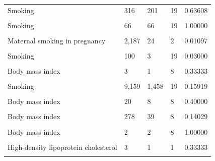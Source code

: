 \documentclass[11pt,oneside]{bristolthesis}
\begin{document}
\begin{table}
{\begin{tabular}[t]{lllll}
Smoking & 316 & 201 & 19 & 0.63608\\
\cellcolor{gray!6}{Arsenic exposure} & \cellcolor{gray!6}{200} & \cellcolor{gray!6}{1} & \cellcolor{gray!6}{1} & \cellcolor{gray!6}{0.00500}\\
\addlinespace
Smoking & 66 & 66 & 19 & 1.00000\\
\cellcolor{gray!6}{Smoking} & \cellcolor{gray!6}{748} & \cellcolor{gray!6}{544} & \cellcolor{gray!6}{19} & \cellcolor{gray!6}{0.72727}\\
Maternal smoking in pregnancy & 2,187 & 24 & 2 & 0.01097\\
\cellcolor{gray!6}{Schizophrenia} & \cellcolor{gray!6}{94} & \cellcolor{gray!6}{1} & \cellcolor{gray!6}{2} & \cellcolor{gray!6}{0.01064}\\
Smoking & 100 & 3 & 19 & 0.03000\\
\addlinespace
\cellcolor{gray!6}{Maternal smoking during pregnancy} & \cellcolor{gray!6}{25} & \cellcolor{gray!6}{7} & \cellcolor{gray!6}{1} & \cellcolor{gray!6}{0.28000}\\
Body mass index & 3 & 1 & 8 & 0.33333\\
\cellcolor{gray!6}{Schizophrenia} & \cellcolor{gray!6}{1,223} & \cellcolor{gray!6}{1} & \cellcolor{gray!6}{2} & \cellcolor{gray!6}{0.00082}\\
Smoking & 9,159 & 1,458 & 19 & 0.15919\\
\cellcolor{gray!6}{C-reactive protein} & \cellcolor{gray!6}{31} & \cellcolor{gray!6}{14} & \cellcolor{gray!6}{1} & \cellcolor{gray!6}{0.45161}\\
\addlinespace
Body mass index & 20 & 8 & 8 & 0.40000\\
\cellcolor{gray!6}{C-reactive protein} & \cellcolor{gray!6}{218} & \cellcolor{gray!6}{14} & \cellcolor{gray!6}{1} & \cellcolor{gray!6}{0.06422}\\
Body mass index & 278 & 39 & 8 & 0.14029\\
\cellcolor{gray!6}{Birth weight} & \cellcolor{gray!6}{6} & \cellcolor{gray!6}{0} & \cellcolor{gray!6}{4} & \cellcolor{gray!6}{0.00000}\\
Body mass index & 2 & 2 & 8 & 1.00000\\
\addlinespace
\cellcolor{gray!6}{Serum high-density lipoprotein cholesterol} & \cellcolor{gray!6}{19} & \cellcolor{gray!6}{4} & \cellcolor{gray!6}{1} & \cellcolor{gray!6}{0.21053}\\
High-density lipoprotein cholesterol & 3 & 1 & 1 & 0.33333\\
\cellcolor{gray!6}{Serum high-density lipoprotein cholesterol} & \cellcolor{gray!6}{110} & \cellcolor{gray!6}{4} & \cellcolor{gray!6}{1} & \cellcolor{gray!6}{0.03636}\\

\end{tabular}}
\end{table}
\end{document}
